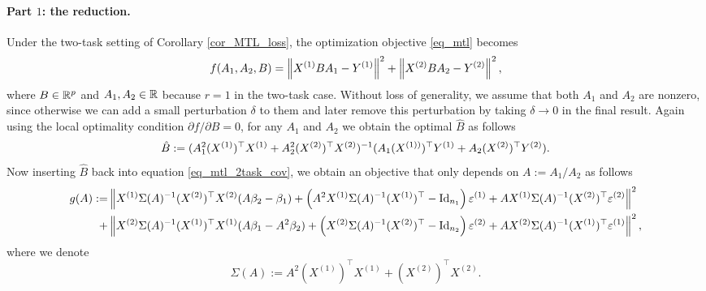  \fi

\paragraph{Part $1$: the reduction.}
Under the two-task setting of Corollary \ref{cor_MTL_loss}, the optimization objective \eqref{eq_mtl} becomes
	\begin{align}
		f(A_1,A_2, B) =   \left\| X^{(1)} B A_1 - Y^{(1)} \right\|^2+ \left\| X^{(2)} B A_2 - Y^{(2)} \right\|^2, \label{eq_mtl_2task_cov}
	\end{align}
	where $B \in \mathbb{R}^{p}$ and $A_1, A_2\in \mathbb{R}$ because $r=1$ in the two-task case. %
	Without loss of generality, we assume that both $A_1$ and $A_2$ are nonzero, since otherwise we can add a small perturbation $\delta$ to them and later remove this perturbation by taking $\delta\to 0$ in the final result. Again using the local optimality condition ${\partial f}/{\partial B} = 0$, for any $A_1$ and $A_2$ we obtain the optimal $\hat{B}$ as follows
	\begin{align}
		\hat{B} \define  (A_1^2 (X^{(1)})^{\top}X^{(1)} + A_2^2 (X^{(2)})^{\top}X^{(2)})^{-1} (A_1 (X^{(1))})^{\top}Y^{(1)} + A_2 (X^{(2)})^{\top}Y^{(2)}). \label{eq_Bhat_2task} %
	\end{align}
 Now inserting $\hat B$ back into equation \eqref{eq_mtl_2task_cov}, we obtain an objective that only depends on $A:=A_1/A_2$ as follows 
 \begin{align}
		 g(A) := & \left\| X^{(1)} \Sigma(A)^{-1} (X^{(2)})^\top X^{(2)} (A\beta_2-\beta_1)+ \left(A^2 X^{(1)}\Sigma(A)^{-1} (X^{(1)})^\top-\operatorname{Id}_{n_1}\right)\varepsilon^{(1)} + A X^{(1)}\Sigma(A)^{-1} (X^{(2)})^\top \varepsilon^{(2)} \right\|^2 \nonumber\\
		 + & \left\| X^{(2)} \Sigma(A)^{-1} (X^{(1)})^\top X^{(1)} (A\beta_1-A^2\beta_2)+ \left(X^{(2)}\Sigma(A)^{-1} (X^{(2)})^\top-\operatorname{Id}_{n_2}\right)\varepsilon^{(2)} + A X^{(2)}\Sigma(A)^{-1} (X^{(1)})^\top \varepsilon^{(1)} \right\|^2, 
		\label{eq_mtl_A12}
	\end{align}
	where we denote
	$$ \Sigma(A):= A^2 (X^{(1)})^\top X^{(1)}  + (X^{(2)})^\top X^{(2)} .$$
